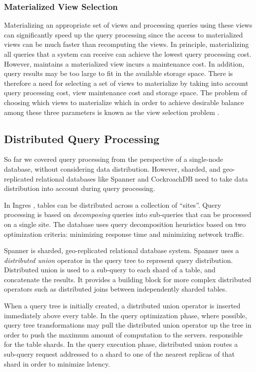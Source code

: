 \subsubsection{Materialized View Selection}

Materializing an appropriate set of views and processing queries using these views can significantly speed up the
query processing since the access to materialized views can be much faster than recomputing the views.
In principle, materializing all queries that a system can receive can achieve the lowest query processing cost.
However, maintains a materialized view incurs a maintenance cost.
In addition, query results may be too large to fit in the available storage space.
There is therefore a need for selecting a set of views to materialize by taking into account query processing cost,
view maintenance cost and storage space.
The problem of choosing which views to materialize which in order to achieve desirable balance among these three
parameters is known as the view selection problem \cite{gupta:viewselection, mami:viewselection}.

\subsection{Distributed Query Processing}

So far we covered query processing from the perspective of a single-node database, without considering data distribution.
However, sharded, and geo-replicated relational databases like Spanner \cite{bacon:spanner} and CockroachDB \cite{cockroachdb:docs}
need to take data distribution into account during query processing.

In Ingres \cite{epstein:ingres}, tables can be distributed across a collection of ``sites''.
Query processing is based on \textit{decomposing} queries into sub-queries that can be processed on a single site.
The database uses query decomposition heuristics based on two optimization criteria:
minimizing response time and minimizing network traffic.

Spanner \cite{bacon:spanner} is sharded, geo-replicated relational database system.
Spanner uses a \textit{distributed union} operator in the query tree to represent query distribution.
Distributed union is used to a sub-query to each shard of a table, and concatenate the results.
It provides a building block for more complex distributed operators such as distributed joins between independently
sharded tables.

When a query tree is initially created, a distributed union operator is inserted immediately above every table.
In the query optimization phase, where possible, query tree transformations may pull the distributed union operator up the tree
in order to push the maximum amount of computation to the servers. responsible for the table shards.
In the query execution phase, distributed union routes a sub-query request addressed to a shard to one of the nearest
replicas of that shard in order to minimize latency.


